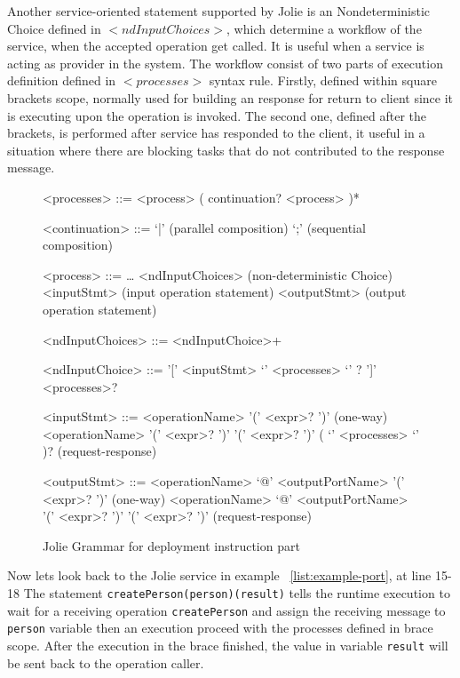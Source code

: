 Another service-oriented statement supported by Jolie is an Nondeterministic Choice defined in \(<ndInputChoices>\), which determine a workflow of the service, when the accepted operation get called. It is useful when a service is acting as provider in the system. The workflow consist of two parts of execution definition defined in \(<processes>\) syntax rule. Firstly, defined within square brackets scope, normally used for building an response for return to client since it is executing upon the operation is invoked. The second one, defined after the brackets, is performed after service has responded to the client, it useful in a situation where there are blocking tasks that do not contributed to the response message.

\begin{figure}[h]
    \begin{framed}
        \begin{grammar}
            <processes>
            ::= <process> ( continuation? <process> )*

            <continuation> ::= `|' \hfill (parallel composition)
            \alt `;' \hfill (sequential composition)

            <process> ::= \dots
            \alt <ndInputChoices> \hfill (non-deterministic Choice)
            \alt <inputStmt> \hfill (input operation statement)
            \alt <outputStmt> \hfill (output operation statement)

            <ndInputChoices>
            ::= <ndInputChoice>+

            <ndInputChoice>
            ::= '[' <inputStmt> `{' <processes> `}' ? ']' <processes>?

            <inputStmt>
            ::= <operationName> '(' <expr>? ')' \hfill (one-way)
            \alt
            <operationName> '(' <expr>? ')' '(' <expr>? ')' ( `{' <processes> `}' )? \hfill (request-response)

            <outputStmt>
            ::= <operationName> `@' <outputPortName> '(' <expr>? ')' \hfill (one-way)
            \alt
            <operationName> `@' <outputPortName> '(' <expr>? ')' '(' <expr>? ')' \hfill (request-response)
        \end{grammar}
    \end{framed}
    \caption{Jolie Grammar for deployment instruction part}
    \label{fig:jolie-process}
\end{figure}

Now lets look back to the Jolie service in example ~\ref{list:example-port}, at line 15-18
The statement \texttt{createPerson(person)(result)} tells the runtime execution to wait for a receiving operation \texttt{createPerson} and assign the receiving message to \texttt{person} variable then an execution proceed with the processes defined in brace scope. After the execution in the brace finished, the value in variable \texttt{result} will be sent back to the operation caller.

